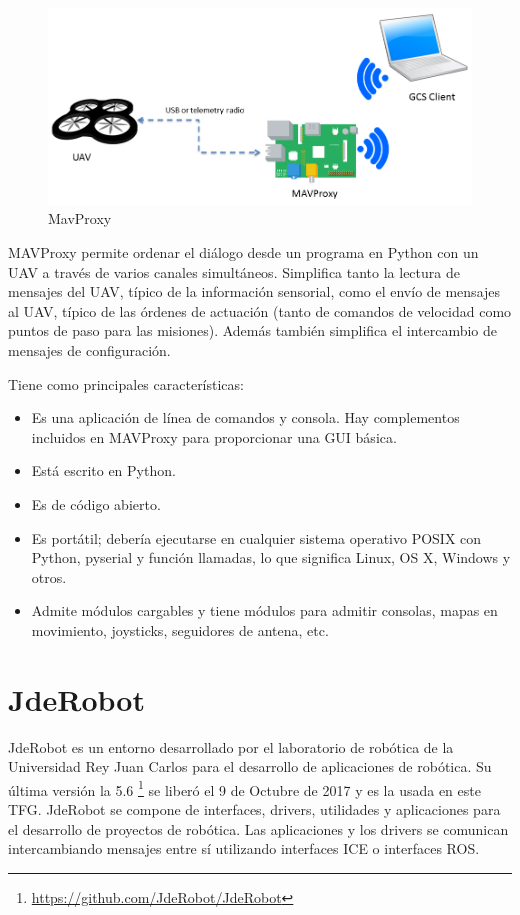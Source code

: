 \begin{figure}[H]
  \centering
  \includegraphics[scale=0.4]{imagenes/bridge.png}
  \caption{MavProxy}
  \label{fig:mavProxy}
\end{figure}

MAVProxy permite ordenar el diálogo desde un programa en Python con un UAV a través de varios canales simultáneos. Simplifica tanto la lectura de mensajes del UAV, típico de la información sensorial, como el envío de mensajes al UAV, típico de las órdenes de actuación (tanto de comandos de velocidad como puntos de paso para las misiones). Además también simplifica el intercambio de mensajes de configuración.

Tiene como principales características:

\begin{itemize}
\item Es una aplicación de línea de comandos y consola. Hay complementos incluidos en MAVProxy
para proporcionar una GUI básica.
\item Está escrito en Python.
\item Es de código abierto.
\item Es portátil; debería ejecutarse en cualquier sistema operativo POSIX con Python, pyserial y función
llamadas, lo que significa Linux, OS X, Windows y otros.
\item Admite módulos cargables y tiene módulos para admitir consolas, mapas en movimiento,
joysticks, seguidores de antena, etc.
\end{itemize}

\section{JdeRobot}
\label{sec:jderobot}

JdeRobot\cite{jderobot} es un entorno desarrollado por el laboratorio de robótica de la Universidad Rey Juan Carlos para el desarrollo de aplicaciones de robótica. Su última versión la 5.6 \footnote{\url{https://github.com/JdeRobot/JdeRobot}} se liberó el 9 de Octubre de 2017 y es la usada en este TFG. JdeRobot se compone de interfaces, drivers, utilidades y aplicaciones para el desarrollo de proyectos de robótica. Las aplicaciones y los drivers se comunican intercambiando mensajes entre sí utilizando interfaces ICE o interfaces ROS.

